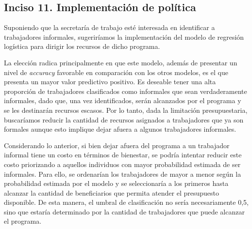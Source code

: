 \subsection*{Inciso 11. Implementación de política}

Suponiendo que la secretaría de trabajo esté interesada en identificar a trabajadores informales, sugeriríamos la implementación del modelo de regresión logística para dirigir los recursos de dicho programa.

La elección radica principalmente en que este modelo, además de presentar un nivel de \textit{accuracy} favorable en comparación con los otros modelos, es el que presenta un mayor valor predictivo positivo. Es deseable tener una alta proporción de trabajadores clasificados como informales que sean verdaderamente informales, dado que, una vez identificados, serán alcanzados por el programa y se les destinarán recursos escasos. Por lo tanto, dada la limitación presupuestaria, buscaríamos reducir la cantidad de recursos asignados a trabajadores que ya son formales aunque esto implique dejar afuera a algunos trabajadores informales.

Considerando lo anterior, si bien dejar afuera del programa a un trabajador informal tiene un costo en términos de bienestar, se podría intentar reducir este costo priorizando a aquellos individuos con mayor probabilidad estimada de ser informales. Para ello, se ordenarían los trabajadores de mayor a menor según la probabilidad estimada por el modelo y se seleccionaría a los primeros hasta alcanzar la cantidad de beneficiarios que permita atender el presupuesto disponible. De esta manera, el umbral de clasificación no sería necesariamente 0,5, sino que estaría determinado por la cantidad de trabajadores que puede alcanzar el programa.

